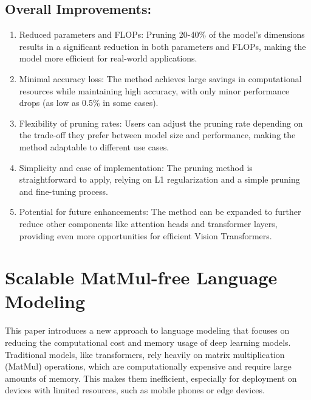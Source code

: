 \documentclass{report}
\begin{document}
	
	\section{Overall Improvements:}
	\begin{enumerate}
		\item 
		Reduced parameters and FLOPs: Pruning 20-40\% of the model's dimensions results in a significant reduction in both parameters and FLOPs, making the model more efficient for real-world applications.
		
		\item 
		Minimal accuracy loss: The method achieves large savings in computational resources while maintaining high accuracy, with only minor performance drops (as low as 0.5\% in some cases).
		
		\item 
		Flexibility of pruning rates: Users can adjust the pruning rate depending on the trade-off they prefer between model size and performance, making the method adaptable to different use cases.
		
		\item 
		Simplicity and ease of implementation: The pruning method is straightforward to apply, relying on L1 regularization and a simple pruning and fine-tuning process.
		
		\item 
		Potential for future enhancements: The method can be expanded to further reduce other components like attention heads and transformer layers, providing even more opportunities for efficient Vision Transformers.
	\end{enumerate}
	
	
	
	
	
	
	
	
	
	
	\chapter{Scalable MatMul-free Language Modeling \cite{zhu2024scalablematmulfreelanguagemodeling}}
	This paper introduces a new approach to language modeling that focuses on reducing the computational cost and memory usage of deep learning models. Traditional models, like transformers, rely heavily on matrix multiplication (MatMul) operations, which are computationally expensive and require large amounts of memory. This makes them inefficient, especially for deployment on devices with limited resources, such as mobile phones or edge devices.
	
\end{document}
